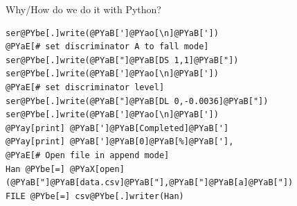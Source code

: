 \documentclass{beamer}
\begin{document}
\begin{frame}[fragile]{Why/How do we do it with Python?}
\begin{Verbatim}[commandchars=@\[\]]                                               
ser@PYbe[.]write(@PYaB[']@PYao[\n]@PYaB['])                                                          
@PYaE[# set discriminator A to fall mode]                                                            
ser@PYbe[.]write(@PYaB["]@PYaB[DS 1,1]@PYaB["])                                                      
ser@PYbe[.]write(@PYaB[']@PYao[\n]@PYaB['])                                                          
@PYaE[# set discriminator level]                                                                     
ser@PYbe[.]write(@PYaB["]@PYaB[DL 0,-0.0036]@PYaB["])                                                
ser@PYbe[.]write(@PYaB[']@PYao[\n]@PYaB['])                                                          
@PYay[print] @PYaB[']@PYaB[Completed]@PYaB[']                                                        
@PYay[print] @PYaB[']@PYaB[0]@PYaB[%]@PYaB['], 
@PYaE[# Open file in append mode]                                                                    
Han @PYbe[=] @PYaX[open](@PYaB["]@PYaB[data.csv]@PYaB["],@PYaB["]@PYaB[a]@PYaB["])                   
FILE @PYbe[=] csv@PYbe[.]writer(Han)
\end{Verbatim}
\end{frame}
\end{document}
